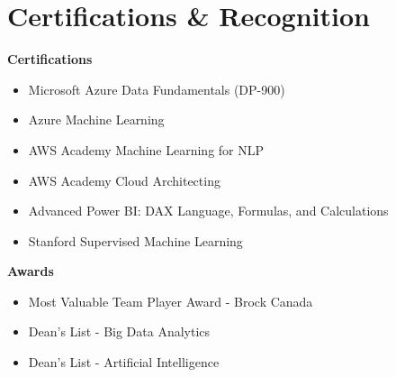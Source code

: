 \documentclass[10.5pt,letterpaper]{article}
\newenvironment{twocolitems}{%
  \begin{itemize}[leftmargin=1.15em, itemsep=1pt, topsep=2pt, parsep=0pt]
}{%
  \end{itemize}
}
\newcommand{\twocollist}[2]{%
  \noindent\begin{minipage}[t]{0.5\linewidth}
    \begin{twocolitems}
    #1
    \end{twocolitems}
  \end{minipage}%
  \begin{minipage}[t]{0.5\linewidth}
    \begin{twocolitems}
    #2
    \end{twocolitems}
  \end{minipage}%
}
\begin{document}
\section{Certifications \& Recognition}
\textbf{Certifications}\\[2pt]
\twocollist{%
  \item Microsoft Azure Data Fundamentals (DP-900)
  \item Azure Machine Learning
  \item AWS Academy Machine Learning for NLP
}{%
  \item AWS Academy Cloud Architecting
  \item Advanced Power BI: DAX Language, Formulas, and Calculations
  \item Stanford Supervised Machine Learning
}
\textbf{Awards}\\[2pt]
\twocollist{%
  \item Most Valuable Team Player Award - Brock Canada
  \item Dean's List - Big Data Analytics
}{%
  \item Dean's List - Artificial Intelligence
}
\end{document}
